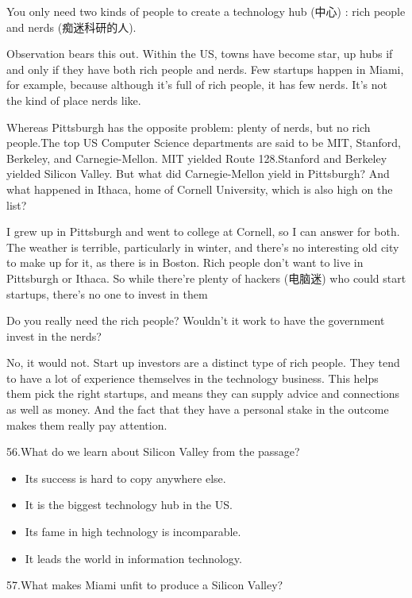 \documentclass[UTF8,11pt]{ctexart}
\begin{document}
You only need two kinds of people to create a technology hub (中心) : rich people and nerds (痴迷科研的人).


Observation bears this out. Within the US, towns have become star, up hubs if and only if they have both rich people and nerds. Few startups happen in Miami, for example, because although it's full of rich people, it has few nerds. It's not the kind of place nerds like.


Whereas Pittsburgh has the opposite problem: plenty of nerds, but no rich people.The top US Computer Science departments are said to be MIT, Stanford, Berkeley, and Carnegie-Mellon. MIT yielded Route 128.Stanford and Berkeley yielded Silicon Valley. But what did Carnegie-Mellon yield in Pittsburgh? And what happened in Ithaca, home of Cornell University, which is also high on the list?


I grew up in Pittsburgh and went to college at Cornell, so I can answer for both. The weather is terrible, particularly in winter, and there's no interesting old city to make up for it, as there is in Boston. Rich people don't want to live in Pittsburgh or Ithaca. So while there're plenty of hackers (电脑迷) who could start startups, there's no one to invest in them


Do you really need the rich people? Wouldn't it work to have the government invest in the nerds?


No, it would not. Start up investors are a distinct type of rich people. They tend to have a lot of experience themselves in the technology business. This helps them pick the right startups, and means they can supply advice and connections as well as money. And the fact that they have a personal stake in the outcome makes them really pay attention.


56.What do we learn about Silicon Valley from the passage?


\begin{itemize}[leftmargin=2em,itemsep=.2em,topsep=.4em]\item[A.] Its success is hard to copy anywhere else.
\item[B.] It is the biggest technology hub in the US.
\item[C.] Its fame in high technology is incomparable.
\item[D.] It leads the world in information technology.
\end{itemize}

57.What makes Miami unfit to produce a Silicon Valley?
\end{document}

